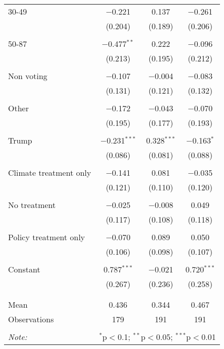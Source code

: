 \begin{tabular}{@{\extracolsep{5pt}}lccc}
 30-49 & $-$0.221 & 0.137 & $-$0.261 \\ 
  & (0.204) & (0.189) & (0.206) \\ 
  & & & \\ 
 50-87 & $-$0.477$^{**}$ & 0.222 & $-$0.096 \\ 
  & (0.213) & (0.195) & (0.212) \\ 
  & & & \\ 
 Non voting & $-$0.107 & $-$0.004 & $-$0.083 \\ 
  & (0.131) & (0.121) & (0.132) \\ 
  & & & \\ 
 Other & $-$0.172 & $-$0.043 & $-$0.070 \\ 
  & (0.195) & (0.177) & (0.193) \\ 
  & & & \\ 
 Trump & $-$0.231$^{***}$ & 0.328$^{***}$ & $-$0.163$^{*}$ \\ 
  & (0.086) & (0.081) & (0.088) \\ 
  & & & \\ 
 Climate treatment only & $-$0.141 & 0.081 & $-$0.035 \\ 
  & (0.121) & (0.110) & (0.120) \\ 
  & & & \\ 
 No treatment & $-$0.025 & $-$0.008 & 0.049 \\ 
  & (0.117) & (0.108) & (0.118) \\ 
  & & & \\ 
 Policy treatment only & $-$0.070 & 0.089 & 0.050 \\ 
  & (0.106) & (0.098) & (0.107) \\ 
  & & & \\ 
 Constant & 0.787$^{***}$ & $-$0.021 & 0.720$^{***}$ \\ 
  & (0.267) & (0.236) & (0.258) \\ 
  & & & \\ 
\hline \\[-1.8ex] 
Mean & 0.436 & 0.344 & 0.467 \\ 
Observations & 179 & 191 & 191 \\ 
\hline 
\hline \\[-1.8ex] 
\textit{Note:}  & \multicolumn{3}{r}{$^{*}$p$<$0.1; $^{**}$p$<$0.05; $^{***}$p$<$0.01} \\ 
\end{tabular} 

